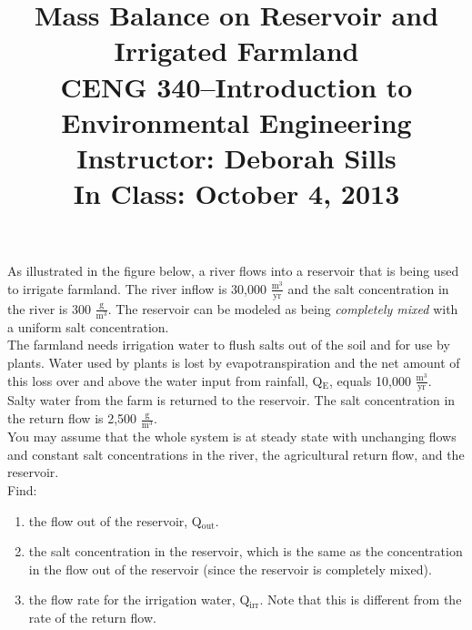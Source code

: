 \documentclass[11pt,letterpaper]{article}
\begin{document}
\setlength{\parindent}{0cm} 



\frenchspacing

\setlength{\textwidth}{6.25in}

\title {\Large{\textbf{Mass Balance on Reservoir and Irrigated Farmland}}\\ \large{CENG 340--Introduction to Environmental Engineering\\
Instructor: Deborah Sills\\ \textbf{In Class: October 4, 2013}}}

\author {}
\date {}
\maketitle

\vspace{-1.5cm}
As illustrated in the figure below, a river flows into a reservoir that is being used to irrigate farmland.  The river inflow is 30,000 $\mathrm{\frac{m^3}{yr}}$ and the salt concentration in the river is 300 $\mathrm{\frac{g}{m^3}}$.  The reservoir can be modeled as being \emph{completely mixed} with a uniform salt concentration.\\

The farmland needs irrigation water to flush salts out of the soil and for use by plants.  Water used by plants is lost by evapotranspiration and the net amount of this loss over and above the water input from rainfall, Q$\mathrm{_E}$, equals 10,000 $\mathrm{\frac{m^3}{yr}}$.\\

Salty water from the farm is returned to the reservoir.  The salt concentration in the return flow is 2,500 $\mathrm{\frac{g}{m^3}}$.\\

You may assume that the whole system is at steady state with unchanging flows and constant salt concentrations in the river, the agricultural return flow, and the reservoir.\\

Find:
\begin{enumerate}
\item the flow out of the reservoir, Q$\mathrm{_{out}}$.
\item the salt concentration in the reservoir, which is the same as the concentration in the flow out of the reservoir (since the reservoir is completely mixed).
\item the flow rate for the irrigation water, Q$\mathrm{_{irr}}$.  Note that this is different from the rate of the return flow.

\end{enumerate}
\end{document}
